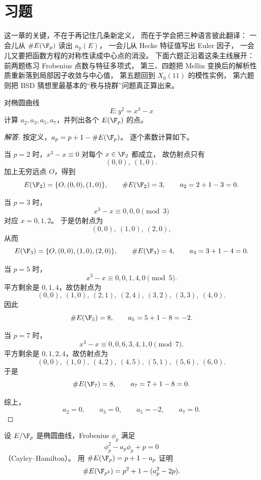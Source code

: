 \section{习题}
\label{sec:ch08-exercises}

这一章的关键，不在于再记住几条新定义，
而在于学会把三种语言彼此翻译：
一会儿从 $\#E(\F_p)$ 读出 $a_p(E)$，
一会儿从 Hecke 特征值写出 Euler 因子，
一会儿又要把函数方程的对称性读成中心点的消没。
下面六题正沿着这条主线展开：
前两题练习 Frobenius 点数与特征多项式，
第三、四题把 Mellin 变换后的解析性质重新落到局部因子收敛与中心值，
第五题回到 $X_0(11)$ 的模性实例，
第六题则把 BSD 猜想里最基本的“秩与挠群”问题真正算出来。



\begin{exercise}
\label{ex:ch08-ap-explicit}
对椭圆曲线
\[
  E\colon y^2=x^3-x
\]
计算 $a_2,a_3,a_5,a_7$，并列出各个 $E(\F_p)$ 的点。
\end{exercise}

\begin{proof}[解答]
按定义，$a_p=p+1-\#E(\F_p)$。
逐个素数计算如下。

当 $p=2$ 时，$x^3-x\equiv0$ 对每个 $x\in\F_2$ 都成立，
故仿射点只有
\[
  (0,0),\ (1,0).
\]
加上无穷远点 $O$，得到
\[
  E(\F_2)=\{O,(0,0),(1,0)\},
  \qquad \#E(\F_2)=3,
  \qquad a_2=2+1-3=0.
\]

当 $p=3$ 时，
\[
  x^3-x\equiv 0,0,0 \pmod 3
\]
对应 $x=0,1,2$。
于是仿射点为
\[
  (0,0),\ (1,0),\ (2,0),
\]
从而
\[
  E(\F_3)=\{O,(0,0),(1,0),(2,0)\},
  \qquad \#E(\F_3)=4,
  \qquad a_3=3+1-4=0.
\]

当 $p=5$ 时，
\[
  x^3-x\equiv 0,0,1,4,0 \pmod 5.
\]
平方剩余是 $0,1,4$，故仿射点为
\[
  (0,0),\ (1,0),\ (2,1),\ (2,4),\ (3,2),\ (3,3),\ (4,0).
\]
因此
\[
  \#E(\F_5)=8,
  \qquad a_5=5+1-8=-2.
\]

当 $p=7$ 时，
\[
  x^3-x\equiv 0,0,6,3,4,1,0 \pmod 7.
\]
平方剩余是 $0,1,2,4$，故仿射点为
\[
  (0,0),\ (1,0),\ (4,2),\ (4,5),\ (5,1),\ (5,6),\ (6,0).
\]
于是
\[
  \#E(\F_7)=8,
  \qquad a_7=7+1-8=0.
\]

综上，
\[
  a_2=0,
  \qquad a_3=0,
  \qquad a_5=-2,
  \qquad a_7=0.
\]
\end{proof}

\begin{exercise}
\label{ex:ch08-frob-poly}
设 $E/\F_p$ 是椭圆曲线，Frobenius $\phi_p$ 满足
\[
  \phi_p^2-a_p\phi_p+p=0
\]
（Cayley--Hamilton）。
用 $\#E(\F_p)=p+1-a_p$ 证明
\[
  \#E(\F_{p^2})=p^2+1-(a_p^2-2p).
\]
\end{exercise}

